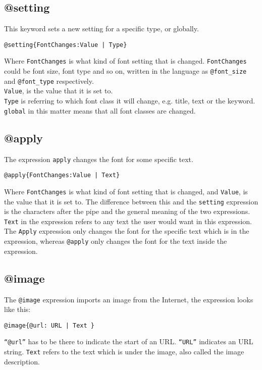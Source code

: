 \subsection{@setting}
This keyword sets a new setting for a specific type, or globally.
\begin{lstlisting}[frame=single]
@setting{FontChanges:Value | Type}
\end{lstlisting}
Where \texttt{FontChanges} is what kind of font setting that is changed. 
\texttt{FontChanges} could be font size, font type and so on, written in the language as \texttt{@font\_size} and \texttt{@font\_type} respectively. \\
\texttt{Value}, is the value that it is set to. \\
\texttt{Type} is referring to which font class it will change, e.g. title, text or the keyword. \\ \texttt{global} in this matter means that all font classes are changed.

\subsection{@apply}
The expression \texttt{apply} changes the font for some specific text.
\begin{lstlisting}[frame=single]
@apply{FontChanges:Value | Text}
\end{lstlisting}
Where \texttt{FontChanges} is what kind of font setting that is changed, and \texttt{Value}, is the value that it is set to. The difference between this and the \texttt{setting} expression is the characters after the pipe and the general meaning of the two expressions. \texttt{Text} in the expression refers to any text the user would want in this expression. The \texttt{Apply} expression only changes the font for the specific text which is in the expression, whereas \texttt{@apply} only changes the font for the text inside the expression.

\subsection{@image}
The \texttt{@image} expression imports an image from the Internet, the expression looks like this:
\begin{lstlisting}[frame=single]
@image{@url: URL | Text }
\end{lstlisting}
\texttt{``@url''} has to be there to indicate the start of an URL. \texttt{``URL''} indicates an URL string. \texttt{Text} refers to the text which is under the image, also called the image description.


